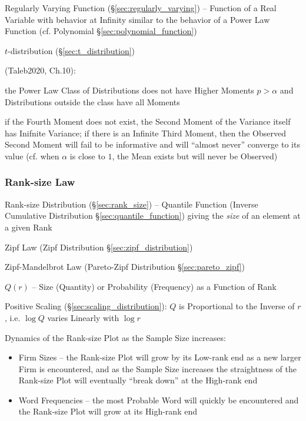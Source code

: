 \fist Regularly Varying Function (\S\ref{sec:regularly_varying}) -- Function of
a Real Variable with behavior at Infinity similar to the behavior of a Power Law
Function (cf. Polynomial \S\ref{sec:polynomial_function})

$t$-distribution (\S\ref{sec:t_distribution})

(Taleb2020, Ch.10):

the Power Law Class of Distributions does not have Higher Moments $p > \alpha$
and Distributions outside the class have all Moments

if the Fourth Moment does not exist, the Second Moment of the Variance itself
has Inifnite Variance; if there is an Infinite Third Moment, then the Observed
Second Moment will fail to be informative and will ``almost never'' converge to
its value (cf. when $\alpha$ is close to $1$, the Mean exists but will never be
Observed)



\subsubsection{Rank-size Law}\label{sec:ranksize_law}

Rank-size Distribution (\S\ref{sec:rank_size}) -- Quantile Function (Inverse
Cumulative Distribution \S\ref{sec:quantile_function}) giving the \emph{size} of
an element at a given Rank

Zipf Law (Zipf Distribution \S\ref{sec:zipf_distribution})

Zipf-Mandelbrot Law (Pareto-Zipf Distribution \S\ref{sec:pareto_zipf})

$Q(r)$ -- Size (Quantity) or Probability (Frequency) as a Function of Rank

Positive Scaling (\S\ref{sec:scaling_distribution}): $Q$ is Proportional to the
Inverse of $r$, i.e. $\log Q$ varies Linearly with $\log r$

Dynamics of the Rank-size Plot as the Sample Size increases:
\begin{itemize}
  \item Firm Sizes -- the Rank-size Plot will grow by its Low-rank end as a new
    larger Firm is encountered, and as the Sample Size increases the
    straightness of the Rank-size Plot will eventually ``break down'' at the
    High-rank end
  \item Word Frequencies -- the most Probable Word will quickly be encountered
    and the Rank-size Plot will grow at its High-rank end
\end{itemize}



